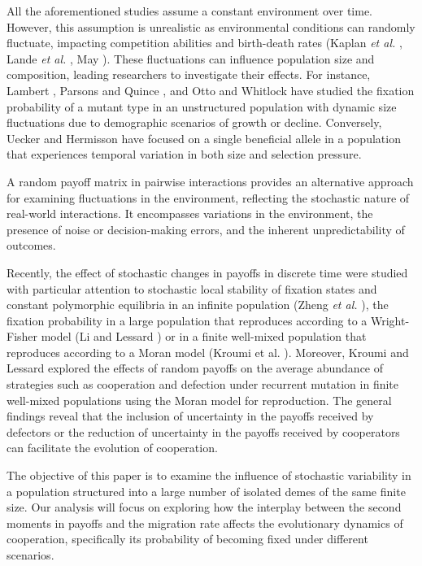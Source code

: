 \documentclass[11pt]{article}
\begin{document}
All the aforementioned studies assume a constant environment over time. However, this assumption is unrealistic as environmental conditions can randomly fluctuate, impacting competition abilities and birth-death rates (Kaplan \textit{et al.} \cite{KHH1990}, Lande \textit{et al.} \cite{LES2003}, May \cite{M1973}). These fluctuations can influence population size and composition, leading researchers to investigate their effects. For instance, Lambert \cite{L2006}, Parsons and Quince \cite{PQ2007a,PQ2007b}, and Otto and Whitlock \cite{OW1997} have studied the fixation probability of a mutant type in an unstructured population with dynamic size fluctuations due to demographic scenarios of growth or decline. Conversely, Uecker and Hermisson \cite{UH2011} have focused on a single beneficial allele in a population that experiences temporal variation in both size and selection pressure.




A random payoff matrix in pairwise interactions provides an alternative approach for examining fluctuations in the environment, reflecting the stochastic nature of real-world interactions. It encompasses variations in the environment, the presence of noise or decision-making errors, and the inherent unpredictability of outcomes. 

Recently, the effect of stochastic changes in payoffs in discrete time were studied with particular attention to stochastic local stability of fixation states and constant polymorphic equilibria in an infinite population (Zheng \emph{et al.} \cite{ZLLT2017, ZLLT2018}), the fixation probability in a large population that reproduces according to a Wright-Fisher model (Li and Lessard \cite{LL2020}) or in a finite well-mixed population that reproduces according to a Moran model (Kroumi et al. \cite{KMLL2021, KML2022}). Moreover,
Kroumi and Lessard \cite{KL2021, KL2022} explored the effects of random payoffs on the average abundance of strategies such as cooperation and defection under recurrent mutation in finite well-mixed populations using the Moran model for reproduction. The general findings reveal that the inclusion of uncertainty in the payoffs received by defectors or the reduction of uncertainty in the payoffs received by cooperators can facilitate the evolution of cooperation. 



The objective of this paper is to examine the influence of stochastic variability in a population structured into a large number of isolated demes of the same finite size. Our analysis will focus on exploring how the interplay between the second moments in payoffs and the migration rate affects the evolutionary dynamics of cooperation, specifically its probability of becoming fixed under different scenarios.
\end{document}
